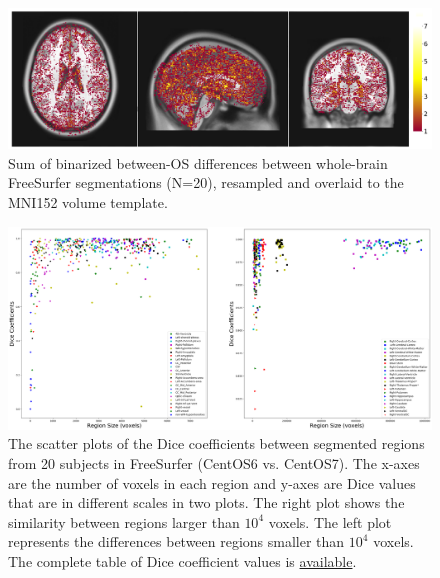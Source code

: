 \documentclass[a4paper,num-refs]{oup-contemporary}
\begin{document}
\begin{figure}
\centering
  \includegraphics[width=\columnwidth]{images/brain_segmentation_mni.png} 
  \caption{Sum of binarized between-OS differences between whole-brain FreeSurfer segmentations (N=20),
           resampled and overlaid to the MNI152 volume template.
} 
  \label{fig:tissue_class}
\end{figure}

\begin{figure}
  \centering
    \includegraphics[width=\textwidth]{images/scatter_plot.png} 
    \caption{The scatter plots of the Dice coefficients between segmented regions 
            from 20 subjects in FreeSurfer (CentOS6 vs. CentOS7). 
            The x-axes are the number of voxels in each region and 
            y-axes are Dice values that are in different scales in two plots.
            The right plot shows the similarity between regions larger than $10^4$ voxels. 
            The left plot represents the differences between 
            regions smaller than $10^4$ voxels.
            The complete table of Dice coefficient values is 
            \href{https://github.com/ali4006/HCP-reproducibility-paper/blob/master/data/dice_values.csv}
            {available}.} 
    \label{fig:scatter_plot}
  \end{figure}

  
\end{document}
